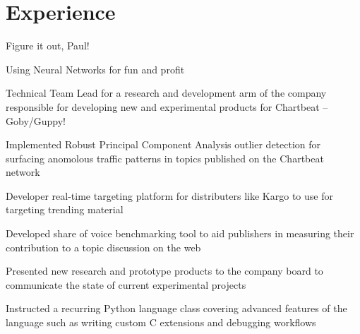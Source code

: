 \documentclass[]{deedy-resume-openfont}
\begin{document}
\lastupdated
{}

\section{Experience}

    \begin{tightemize}
        \item
            Figure it out, Paul!
    \end{tightemize}

    \begin{tightemize}
        \item
            Using Neural Networks for fun and profit
        \item
            Technical Team Lead for a research and development arm of the
            company responsible for developing new and experimental products for
            Chartbeat -- Goby/Guppy!
        \item
            Implemented Robust Principal Component Analysis outlier detection
            for surfacing anomolous traffic patterns in topics published on the
            Chartbeat network
        \item
            Developer real-time targeting platform for distributers like Kargo
            to use for targeting trending material
        \item
            Developed share of voice benchmarking tool to aid publishers in
            measuring their contribution to a topic discussion on the web
        \item
            Presented new research and prototype products to the company board
            to communicate the state of current experimental projects
        \item
            Instructed a recurring Python language class covering advanced
            features of the language such as writing custom C extensions and
            debugging workflows
    \end{tightemize}
\end{document}
